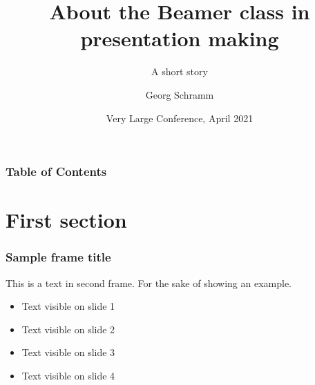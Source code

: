\documentclass[8pt,aspectratio=169,xcolor=dvipsnames]{beamer} %
\title[About Beamer] %
{\textbf{About the Beamer class in presentation making}}
\subtitle{A short story}
\author[Schramm, Georg] %
{Georg Schramm\inst{1}}
\institute[KUL] %
{
  \inst{1}%
  Department of Imaging and Pathology\\
  KU Leuven
}
\date[VLC 2021] %
{Very Large Conference, April 2021}
\begin{document}
\frame{\titlepage}


\begin{frame}
\frametitle{Table of Contents}
\tableofcontents
\end{frame}


\section{First section}

\begin{frame}
\frametitle{Sample frame title}
This is a text in second frame. For the sake of showing an example.

\begin{itemize}
    \item<1-> Text visible on slide 1
    \item<2-> Text visible on slide 2
    \item<3>  Text visible on slide 3
    \item<4-> Text visible on slide 4
\end{itemize}
\end{frame}

\end{document}

